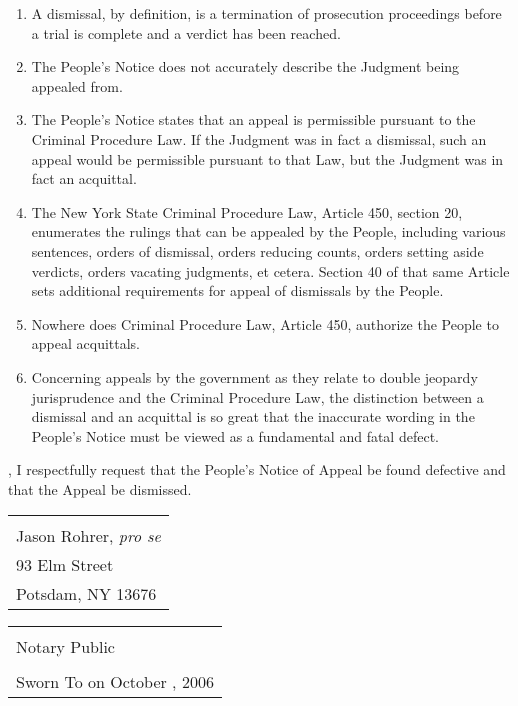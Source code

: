 \documentclass[12pt]{article}
\begin{document}
\begin{enumerate}
\item A dismissal, by definition, is a termination of prosecution proceedings before a trial is complete and a verdict has been reached.

\item The People's Notice does not accurately describe the Judgment being appealed from.

\item The People's Notice states that an appeal is permissible pursuant to the Criminal Procedure Law.
If the Judgment was in fact a dismissal, such an appeal would be permissible pursuant to that Law, but the Judgment was in fact an acquittal.

\item The New York State Criminal Procedure Law, Article 450, section 20, enumerates the rulings that can be appealed by the People, including various sentences, orders of dismissal, orders reducing counts, orders setting aside verdicts, orders vacating judgments, et cetera.
Section 40 of that same Article sets additional requirements for appeal of dismissals by the People.

\item Nowhere does Criminal Procedure Law, Article 450, authorize the People to appeal acquittals.

\item Concerning appeals by the government as they relate to double jeopardy jurisprudence and the Criminal Procedure Law, the distinction between a dismissal and an acquittal is so great that the inaccurate wording in the People's Notice must be viewed as a fundamental and fatal defect.

\end{enumerate}

, I respectfully request that the People's Notice of Appeal be found defective and that the Appeal be dismissed.


\singlespacing

\begin{flushright}
\begin{tabular}{l}
\\
\\
\hline
\\
Jason Rohrer, {\em pro se}\\
93 Elm Street\\
Potsdam, NY 13676
\end{tabular}
\end{flushright}

\begin{tabular}{l}
\\
\\
\hline
\\
Notary Public\\
\\
Sworn To on October \underline{\hspace{0.25in}}, 2006
\end{tabular}
\end{document}
